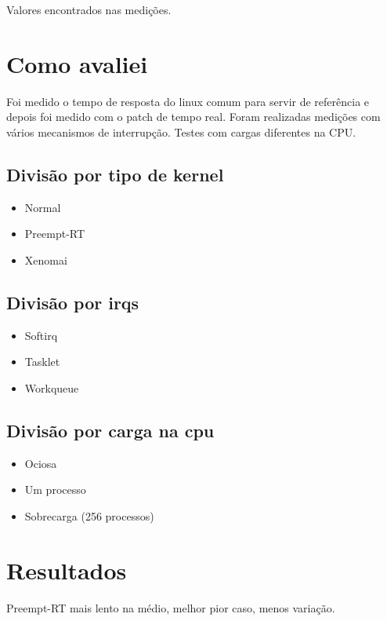 
Valores encontrados nas medições.

\section{Como avaliei}

Foi medido o tempo de resposta do linux comum para servir de referência e depois foi medido com o patch de tempo real. Foram realizadas medições com vários mecanismos de interrupção. Testes com cargas diferentes na CPU.

\subsection{Divisão por tipo de kernel}

\begin{itemize}
\item Normal
\item Preempt-RT
\item Xenomai
\end{itemize}

\subsection{Divisão por irqs}

\begin{itemize}
\item Softirq
\item Tasklet
\item Workqueue
\end{itemize}

\subsection{Divisão por carga na cpu}

\begin{itemize}
\item Ociosa
\item Um processo
\item Sobrecarga (256 processos)
\end{itemize}

\section{Resultados}

Preempt-RT mais lento na médio, melhor pior caso, menos variação.

